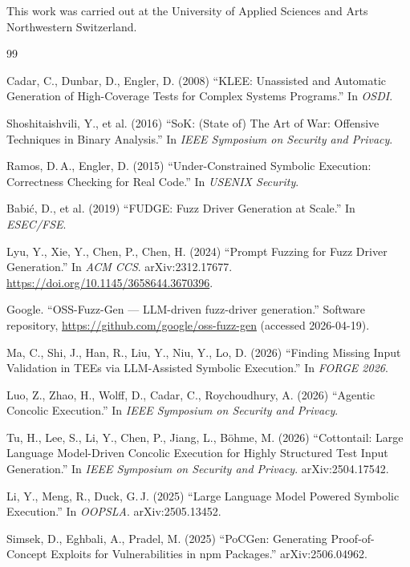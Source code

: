 \documentclass[3p,times,procedia]{elsarticle}
\begin{document}
This work was carried out at the University of Applied Sciences and Arts Northwestern Switzerland.

\begin{thebibliography}{99}

 Cadar, C., Dunbar, D., Engler, D. (2008) ``KLEE: Unassisted and Automatic Generation of High-Coverage Tests for Complex Systems Programs.'' In \emph{OSDI}.

 Shoshitaishvili, Y., et al. (2016) ``SoK: (State of) The Art of War: Offensive Techniques in Binary Analysis.'' In \emph{IEEE Symposium on Security and Privacy}.

 Ramos, D.\,A., Engler, D. (2015) ``Under-Constrained Symbolic Execution: Correctness Checking for Real Code.'' In \emph{USENIX Security}.

 Babi\'{c}, D., et al. (2019) ``FUDGE: Fuzz Driver Generation at Scale.'' In \emph{ESEC/FSE}.

 Lyu, Y., Xie, Y., Chen, P., Chen, H. (2024) ``Prompt Fuzzing for Fuzz Driver Generation.'' In \emph{ACM CCS}. arXiv:2312.17677. \url{https://doi.org/10.1145/3658644.3670396}.

 Google. ``OSS-Fuzz-Gen --- LLM-driven fuzz-driver generation.'' Software repository, \url{https://github.com/google/oss-fuzz-gen} (accessed 2026-04-19).

 Ma, C., Shi, J., Han, R., Liu, Y., Niu, Y., Lo, D. (2026) ``Finding Missing Input Validation in TEEs via LLM-Assisted Symbolic Execution.'' In \emph{FORGE 2026}.

 Luo, Z., Zhao, H., Wolff, D., Cadar, C., Roychoudhury, A. (2026) ``Agentic Concolic Execution.'' In \emph{IEEE Symposium on Security and Privacy}.

 Tu, H., Lee, S., Li, Y., Chen, P., Jiang, L., B\"{o}hme, M. (2026) ``Cottontail: Large Language Model-Driven Concolic Execution for Highly Structured Test Input Generation.'' In \emph{IEEE Symposium on Security and Privacy}. arXiv:2504.17542.

 Li, Y., Meng, R., Duck, G.\,J. (2025) ``Large Language Model Powered Symbolic Execution.'' In \emph{OOPSLA}. arXiv:2505.13452.

 Simsek, D., Eghbali, A., Pradel, M. (2025) ``PoCGen: Generating Proof-of-Concept Exploits for Vulnerabilities in npm Packages.'' arXiv:2506.04962.


\end{thebibliography}
\end{document}
